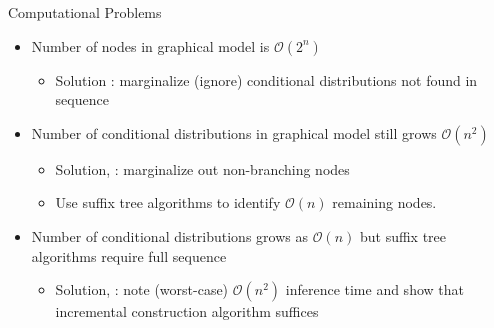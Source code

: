 
\begin{frame}[t]{Computational Problems}
\begin{itemize}
\item Number of nodes in graphical model is $\mathcal{O}(2^n)$
\begin{itemize}
\item Solution : marginalize (ignore) conditional distributions not found in sequence
\end{itemize}
\item Number of conditional distributions in graphical model still grows $\mathcal{O}(n^2)$
\begin{itemize}
\item Solution, \citet{Wood2009} : marginalize out non-branching nodes \cite{Pitman1999, Ho2006}
\item Use suffix tree algorithms to identify  $\mathcal{O}(n)$ remaining nodes.
\end{itemize}
\item Number of conditional distributions grows as $\mathcal{O}(n)$ but suffix tree algorithms require full sequence
\begin{itemize}
\item Solution, \citet{Gasthaus2010} : note (worst-case) $\mathcal{O}(n^2)$ inference time and show that incremental construction algorithm suffices
\end{itemize}
\end{itemize}
\end{frame}


